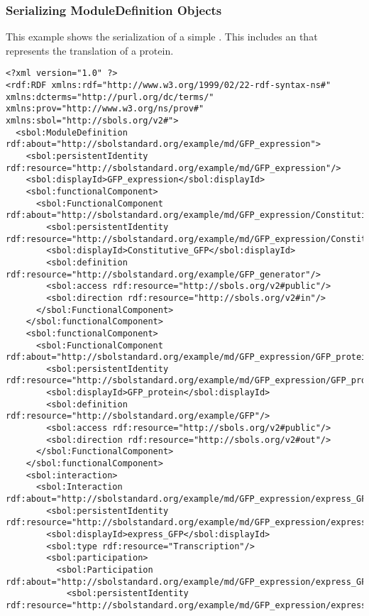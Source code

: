 \subsubsection{Serializing ModuleDefinition Objects}
This example shows the serialization of a simple . This  includes an  that represents the translation of a protein.
\begin{lstlisting}
<?xml version="1.0" ?>
<rdf:RDF xmlns:rdf="http://www.w3.org/1999/02/22-rdf-syntax-ns#" xmlns:dcterms="http://purl.org/dc/terms/" xmlns:prov="http://www.w3.org/ns/prov#" xmlns:sbol="http://sbols.org/v2#">
  <sbol:ModuleDefinition rdf:about="http://sbolstandard.org/example/md/GFP_expression">
    <sbol:persistentIdentity rdf:resource="http://sbolstandard.org/example/md/GFP_expression"/>
    <sbol:displayId>GFP_expression</sbol:displayId>
    <sbol:functionalComponent>
      <sbol:FunctionalComponent rdf:about="http://sbolstandard.org/example/md/GFP_expression/Constitutive_GFP">
        <sbol:persistentIdentity rdf:resource="http://sbolstandard.org/example/md/GFP_expression/Constitutive_GFP"/>
        <sbol:displayId>Constitutive_GFP</sbol:displayId>
        <sbol:definition rdf:resource="http://sbolstandard.org/example/GFP_generator"/>
        <sbol:access rdf:resource="http://sbols.org/v2#public"/>
        <sbol:direction rdf:resource="http://sbols.org/v2#in"/>
      </sbol:FunctionalComponent>
    </sbol:functionalComponent>
    <sbol:functionalComponent>
      <sbol:FunctionalComponent rdf:about="http://sbolstandard.org/example/md/GFP_expression/GFP_protein">
        <sbol:persistentIdentity rdf:resource="http://sbolstandard.org/example/md/GFP_expression/GFP_protein"/>
        <sbol:displayId>GFP_protein</sbol:displayId>
        <sbol:definition rdf:resource="http://sbolstandard.org/example/GFP"/>
        <sbol:access rdf:resource="http://sbols.org/v2#public"/>
        <sbol:direction rdf:resource="http://sbols.org/v2#out"/>
      </sbol:FunctionalComponent>
    </sbol:functionalComponent>
    <sbol:interaction>
      <sbol:Interaction rdf:about="http://sbolstandard.org/example/md/GFP_expression/express_GFP">
        <sbol:persistentIdentity rdf:resource="http://sbolstandard.org/example/md/GFP_expression/express_GFP"/>
        <sbol:displayId>express_GFP</sbol:displayId>
        <sbol:type rdf:resource="Transcription"/>
        <sbol:participation>
          <sbol:Participation rdf:about="http://sbolstandard.org/example/md/GFP_expression/express_GFP/Protein">
            <sbol:persistentIdentity rdf:resource="http://sbolstandard.org/example/md/GFP_expression/express_GFP/Protein"/>

\end{lstlisting}

